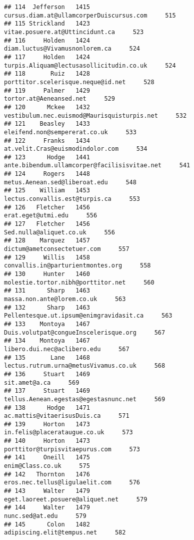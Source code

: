 \documentclass[
]{article}
\begin{document}
\begin{verbatim}
## 114  Jefferson   1415          cursus.diam.at@ullamcorperDuiscursus.com     515
## 115 Strickland   1423                   vitae.posuere.at@Uttincidunt.ca     523
## 116     Holden   1424                    diam.luctus@Vivamusnonlorem.ca     524
## 117     Holden   1424          turpis.Aliquam@lectusasollicitudin.co.uk     524
## 118       Ruiz   1428                porttitor.scelerisque.neque@id.net     528
## 119     Palmer   1429                           tortor.at@Aeneansed.net     529
## 120      Mckee   1432       vestibulum.nec.euismod@Maurisquisturpis.net     532
## 121    Beasley   1433                     eleifend.non@sempererat.co.uk     533
## 122     Franks   1434                  at.velit.Cras@euismodindolor.com     534
## 123      Hodge   1441      ante.bibendum.ullamcorper@facilisisvitae.net     541
## 124     Rogers   1448                     metus.Aenean.sed@liberoat.edu     548
## 125    William   1453                    lectus.convallis.est@turpis.ca     553
## 126   Fletcher   1456                                erat.eget@utmi.edu     556
## 127   Fletcher   1456                           Sed.nulla@aliquet.co.uk     556
## 128    Marquez   1457                       dictum@ametconsectetuer.com     557
## 129     Willis   1458                 convallis.in@parturientmontes.org     558
## 130     Hunter   1460                molestie.tortor.nibh@porttitor.net     560
## 131      Sharp   1463                        massa.non.ante@lorem.co.uk     563
## 132      Sharp   1463           Pellentesque.ut.ipsum@enimgravidasit.ca     563
## 133    Montoya   1467             Duis.volutpat@congueInscelerisque.org     567
## 134    Montoya   1467                       libero.dui.nec@aclibero.edu     567
## 135       Lane   1468             lectus.rutrum.urna@metusVivamus.co.uk     568
## 136     Stuart   1469                                     sit.amet@a.ca     569
## 137     Stuart   1469             tellus.Aenean.egestas@egestasnunc.net     569
## 138      Hodge   1471                       ac.mattis@vitaerisusDuis.ca     571
## 139     Horton   1473                      in.felis@placerataugue.co.uk     573
## 140     Horton   1473                    porttitor@turpisvitaepurus.com     573
## 141     Oneill   1475                                  enim@Class.co.uk     575
## 142   Thornton   1476                    eros.nec.tellus@ligulaelit.com     576
## 143     Walter   1479                  eget.laoreet.posuere@aliquet.net     579
## 144     Walter   1479                                   nunc.sed@at.edu     579
## 145      Colon   1482                        adipiscing.elit@tempus.net     582

\end{verbatim}
\end{document}
